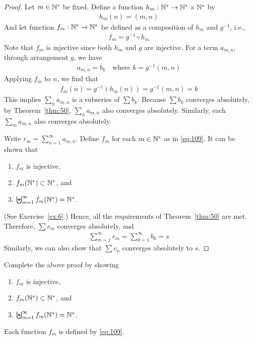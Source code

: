 \documentclass[thmcnt=section, 12pt]{my-elegantbook}
\begin{document}
\begin{proof}
    Let $m \in \mathbb{N}^\ast$ be fixed. Define a function $h_m: \mathbb{N}^\ast \to \mathbb{N}^\ast \times \mathbb{N}^\ast$ by 
    \begin{align*}
        h_m(n) = (m, n)
    \end{align*}
    And let function $f_m: \mathbb{N}^\ast \to \mathbb{N}^\ast$ be defined as a composition of $h_m$ and $g^{-1}$, i.e.,
    \begin{align}
        f_m = g^{-1} \circ h_m
        \label{eq:109}
    \end{align}
    Note that $f_m$ is injective since both $h_m$ and $g$ are injective. For a term $a_{m,n}$, through arrangement $g$, we have 
    \begin{align*}
        a_{m,n} = b_k
        \quad \text{where $k = g^{-1}(m,n)$}
    \end{align*}
    Applying $f_m$ to $n$, we find that 
    \begin{align*}
        f_m(n) = g^{-1}( h_m(n) )
        = g^{-1}(m, n)
        = k
    \end{align*}
    This implies $\sum_n a_{m,n}$ is a subseries of $\sum b_k$. Because $\sum b_k$ converges absolutely, by Theorem~\ref{thm:50}, $\sum_n a_{m,n}$ also converges absolutely. Similarly, each $\sum_m a_{m,n}$ also converges absolutely.

    Write $r_m = \sum_{n=1}^\infty a_{m,n}$. Define $f_m$ for each $m \in \mathbb{N}^\ast$ as in \eqref{eq:109}. It can be shown that 
    \begin{enumerate}
        \item $f_m$ is injective,
        \item $f_m(\mathbb{N}^\ast) \subset \mathbb{N}^\ast$, and 
        \item $\biguplus_{m=1}^\infty f_m(\mathbb{N}^\ast) = \mathbb{N}^\ast$.
    \end{enumerate}
    (See Exercise~\ref{ex:6}.) Hence, all the requirements of Theorem~\ref{thm:50} are met. Therefore, $\sum r_m$ converges absolutely, and 
    \begin{align*}
        \sum_{m=1}^\infty r_m 
        = \sum_{k=1}^\infty b_k 
        = s
    \end{align*}
    Similarly, we can also show that $\sum c_n$ converges absolutely to $s$.
\end{proof}

\begin{exercise}
    Complete the above proof by showing 
    \begin{enumerate}
        \item $f_m$ is injective,
        \item $f_m(\mathbb{N}^\ast) \subset \mathbb{N}^\ast$, and 
        \item $\biguplus_{m=1}^\infty f_m(\mathbb{N}^\ast) = \mathbb{N}^\ast$.
    \end{enumerate}
    Each function $f_m$ is defined by \eqref{eq:109}.
    \label{ex:6}
\end{exercise}
\end{document}
